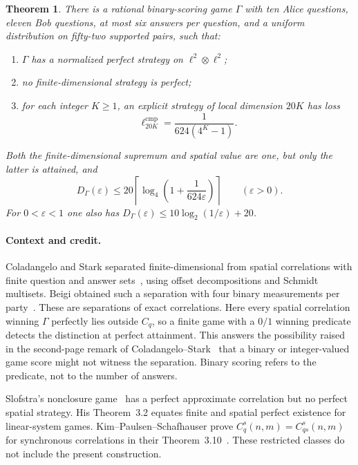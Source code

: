 \documentclass[11pt]{article}
\newtheorem{theorem}{Theorem}[section]
\theoremstyle{definition}
\newcommand{\eps}{\varepsilon}
\begin{document}
\begin{theorem}\label{thm:main}
There is a rational binary-scoring game $\Gamma$ with ten Alice questions, eleven Bob questions, at most six answers per question, and a uniform distribution on fifty-two supported pairs, such that:
\begin{enumerate}
\item $\Gamma$ has a normalized perfect strategy on $\ell^2\otimes\ell^2$;
\item no finite-dimensional strategy is perfect;
\item for each integer $K\geq1$, an explicit strategy of local dimension $20K$ has loss
\begin{equation}\label{eq:exactloss}
\ell^{\mathrm{cmp}}_{20K}=\frac{1}{624(4^K-1)}.
\end{equation}
\end{enumerate}
Both the finite-dimensional supremum and spatial value are one, but only the latter is attained, and
\begin{equation}\label{eq:dimension}
D_\Gamma(\eps)\leq20\left\lceil\log_4\left(1+\frac{1}{624\eps}\right)\right\rceil\qquad(\eps>0).
\end{equation}
For $0<\eps<1$ one also has $D_\Gamma(\eps)\leq10\log_2(1/\eps)+20$.
\end{theorem}

\paragraph{Context and credit.}
Coladangelo and Stark separated finite-dimensional from spatial correlations with finite question and answer sets~\cite{CS18}, using offset decompositions and Schmidt multisets. Beigi obtained such a separation with four binary measurements per party~\cite{Beigi}. These are separations of exact correlations. Here every spatial correlation winning $\Gamma$ perfectly lies outside $C_q$, so a finite game with a $0/1$ winning predicate detects the distinction at perfect attainment. This answers the possibility raised in the second-page remark of Coladangelo--Stark~\cite{CS17} that a binary or integer-valued game score might not witness the separation. Binary scoring refers to the predicate, not to the number of answers.

Slofstra's nonclosure game~\cite{Slofstra} has a perfect approximate correlation but no perfect spatial strategy. His Theorem~3.2 equates finite and spatial perfect existence for linear-system games. Kim--Paulsen--Schafhauser prove $C_q^s(n,m)=C_{qs}^s(n,m)$ for synchronous correlations in their Theorem~3.10~\cite{KPS}. These restricted classes do not include the present construction.
\end{document}
